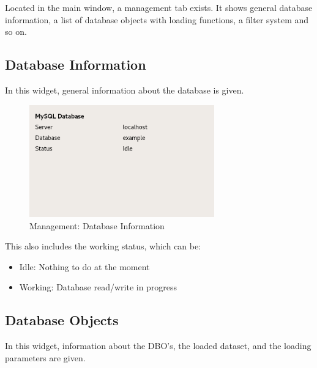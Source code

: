 \documentclass[10pt,letterpaper,extrafontsizes]{memoir}
\begin{document}
Located in the main window, a management tab exists.  It shows general database information, a list of database objects with loading functions, a filter system and so on.

\subsection{Database Information}

In this widget, general information about the database is given. 

\begin{figure}[H]
  \center
    \includegraphics[width=8cm]{../screenshots/management_database.png}
  \caption{Management: Database Information}
  \label{fig:management_database}
\end{figure}

This also includes the working status, which can be:

\begin{itemize}
 \item Idle: Nothing to do at the moment
 \item Working: Database read/write in progress
\end{itemize}

\subsection{Database Objects}
\label{sec:management_dbos}

In this widget, information about the DBO's, the loaded dataset, and the loading parameters are given.
\end{document}
